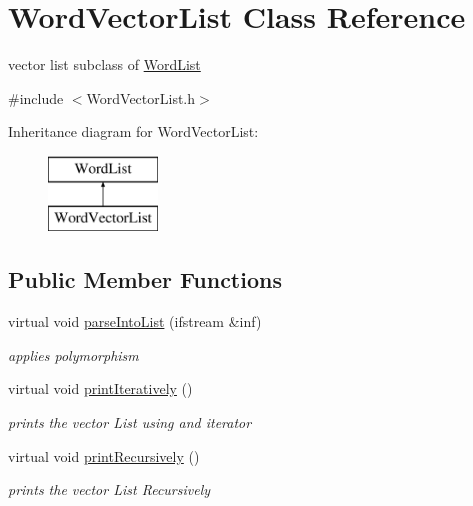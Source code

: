 \hypertarget{classWordVectorList}{\section{Word\-Vector\-List Class Reference}
\label{classWordVectorList}
}


vector list subclass of \hyperlink{classWordList}{Word\-List}  




{\ttfamily \#include $<$Word\-Vector\-List.\-h$>$}

Inheritance diagram for Word\-Vector\-List\-:\begin{figure}[H]
\begin{center}
\leavevmode
\includegraphics[height=2.000000cm]{classWordVectorList}
\end{center}
\end{figure}
\subsection*{Public Member Functions}
\begin{DoxyCompactItemize}
\item 
virtual void \hyperlink{classWordVectorList_a5c34565d237b25447223ba857ee6d181}{parse\-Into\-List} (ifstream \&inf)
\begin{DoxyCompactList}\small\item\em applies polymorphism \end{DoxyCompactList}\item 
\hypertarget{classWordVectorList_aaca0c4541139739a209901d234e2af11}{virtual void \hyperlink{classWordVectorList_aaca0c4541139739a209901d234e2af11}{print\-Iteratively} ()}\label{classWordVectorList_aaca0c4541139739a209901d234e2af11}

\begin{DoxyCompactList}\small\item\em prints the vector List using and iterator \end{DoxyCompactList}\item 
\hypertarget{classWordVectorList_ae76eba4758b69d9c7efb433555971f2f}{virtual void \hyperlink{classWordVectorList_ae76eba4758b69d9c7efb433555971f2f}{print\-Recursively} ()}\label{classWordVectorList_ae76eba4758b69d9c7efb433555971f2f}

\begin{DoxyCompactList}\small\item\em prints the vector List Recursively \end{DoxyCompactList}\end{DoxyCompactItemize}


